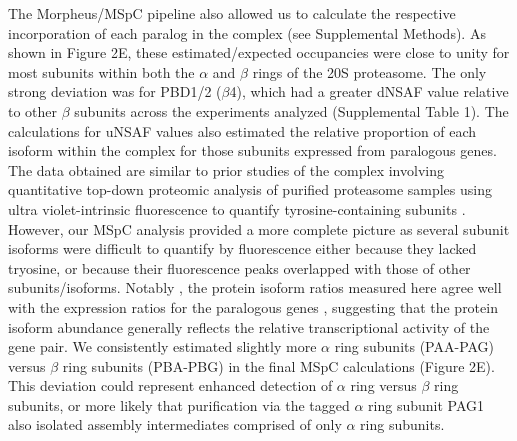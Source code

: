 The Morpheus/MSpC pipeline also allowed us to calculate the respective incorporation of each paralog in the complex (see Supplemental Methods).
As shown in Figure 2E, these estimated/expected occupancies were close to unity for most subunits within both the $\alpha$ and $\beta$ rings of the 20S proteasome.
The only strong deviation was for PBD1/2 ($\beta$4), which  had a greater dNSAF value relative to other $\beta$ subunits across the experiments analyzed (Supplemental Table 1).
The calculations for uNSAF values also estimated the relative proportion of each isoform within the complex for those subunits expressed from paralogous genes.
The data obtained are similar to prior studies of the complex involving quantitative top-down proteomic analysis of purified proteasome samples using ultra violet-intrinsic fluorescence to quantify tyrosine-containing subunits \citep{russell13}.
However, our MSpC analysis provided a more complete picture as several subunit isoforms were difficult to quantify by fluorescence either because they lacked tryosine, or because their fluorescence peaks overlapped with those of other subunits/isoforms.
Notably , the protein isoform ratios measured here agree well with the expression ratios for the paralogous genes \citep{book10}, suggesting that the protein isoform abundance generally reflects the relative transcriptional activity of the gene pair.
We consistently estimated slightly more $\alpha$ ring subunits (PAA-PAG) versus $\beta$ ring subunits (PBA-PBG) in the final MSpC calculations (Figure 2E).
This deviation could represent enhanced detection of $\alpha$ ring versus $\beta$ ring subunits, or more likely that purification via the tagged $\alpha$ ring subunit PAG1 also isolated assembly intermediates comprised of only $\alpha$ ring subunits.

